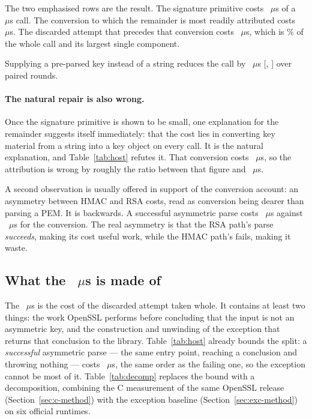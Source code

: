 \documentclass[pdflatex,sn-basic,twocolumn]{sn-jnl}%
\begin{document}
The two emphasised rows are the result. The signature primitive costs
\HostHmacString~$\mu$s of a \HostJwtString~$\mu$s call. The conversion to which
the remainder is most readily attributed costs
\HostCreateSecretKey~$\mu$s. The discarded attempt that precedes that conversion
costs \HostProbeThrows~$\mu$s, which is \HostProbeShareOfCall\% of the whole call
and its largest single component.

Supplying a pre-parsed key instead of a string reduces the call by
\HostStringPenalty~$\mu$s [\HostStringPenaltyCiLo, \HostStringPenaltyCiHi] over
\HostStringPenaltyRounds{} paired rounds.

\paragraph{The natural repair is also wrong.} Once the signature primitive is
shown to be small, one explanation for the remainder suggests itself immediately:
that the cost lies in converting key material from a string into a key object on
every call. It is the natural explanation, and Table~\ref{tab:host} refutes
it. That conversion costs
\HostCreateSecretKey~$\mu$s, so the attribution is wrong by roughly the ratio
between that figure and \HostProbeThrows~$\mu$s.

A second observation is usually offered in support of the conversion account: an
asymmetry between HMAC and RSA costs, read as conversion being dearer than
parsing a PEM. It is backwards. A successful asymmetric parse costs
\HostProbeSucceeds~$\mu$s against \HostCreateSecretKey~$\mu$s for the
conversion. The real asymmetry is that the RSA path's parse \emph{succeeds},
making its cost useful work, while the HMAC path's fails, making it waste.

\subsection{What the \texorpdfstring{\HostProbeThrows~$\mu$s}{18 us} is made
of}\label{sec:granularity}

The \HostProbeThrows~$\mu$s is the cost of the discarded attempt taken whole. It
contains at least two things: the work OpenSSL performs before concluding that
the input is not an asymmetric key, and the construction and unwinding of the
exception that returns that conclusion to the library. Table~\ref{tab:host}
already bounds the split: a \emph{successful} asymmetric parse --- the same
entry point, reaching a conclusion and throwing nothing --- costs
\HostProbeSucceeds~$\mu$s, the same order as the failing one, so the exception
cannot be most of it. Table~\ref{tab:decomp} replaces the bound with a
decomposition, combining the C measurement of the same OpenSSL release
(Section~\ref{sec:c-method}) with the exception baseline
(Section~\ref{sec:exc-method}) on six official runtimes.
\end{document}
